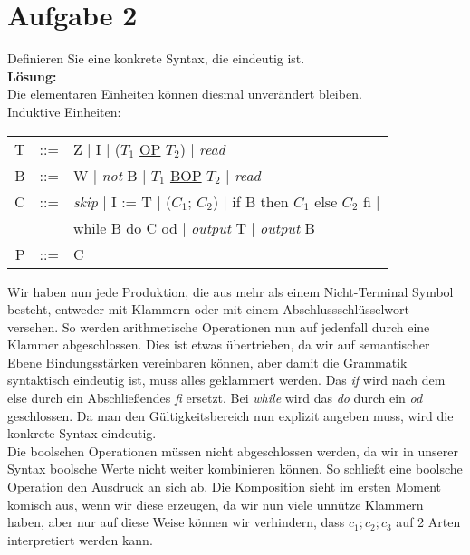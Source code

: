 \documentclass[11pt,a4paper,ngerman]{article}
\begin{document}

\section*{Aufgabe 2}

Definieren Sie eine konkrete Syntax, die eindeutig ist. \\

\textbf{Lösung:}\\

Die elementaren Einheiten können diesmal unverändert bleiben.\\

Induktive Einheiten:\\
\begin{tabular}{rcl}
T &::=& Z | I | ($T_1$ \underline{OP} $T_2$) | \emph{read}\\
B &::=& W | \emph{not} B | $T_1$ \underline{BOP} $T_2$  | \emph{read}\\
C &::=& \emph{skip} | I := T | ($C_1$; $C_2$) | if B then $C_1$ else $C_2$ fi | \\
    &     &  while B do C od | \emph{output} T | \emph{output} B\\
P &::=& C
\end{tabular}

Wir haben nun jede Produktion, die aus mehr als einem Nicht-Terminal Symbol besteht, entweder mit Klammern oder mit einem Abschlussschlüsselwort versehen. So werden arithmetische Operationen nun auf jedenfall durch eine Klammer abgeschlossen. Dies ist etwas übertrieben, da wir auf semantischer Ebene Bindungsstärken vereinbaren können, aber damit die Grammatik syntaktisch eindeutig ist, muss alles geklammert werden. Das \emph{if} wird nach dem else durch ein Abschließendes \emph{fi} ersetzt. Bei \emph{while} wird das \emph{do} durch ein \emph{od} geschlossen. Da man den Gültigkeitsbereich nun explizit angeben muss, wird die konkrete Syntax eindeutig.\\
Die boolschen Operationen müssen nicht abgeschlossen werden, da wir in unserer Syntax boolsche Werte nicht weiter kombinieren können. So schließt eine boolsche Operation den Ausdruck an sich ab. Die Komposition sieht im ersten Moment komisch aus, wenn wir diese erzeugen, da wir nun viele unnütze Klammern haben, aber nur auf diese Weise können wir verhindern, dass $c_1;c_2;c_3$ auf 2 Arten interpretiert werden kann.
\end{document}
